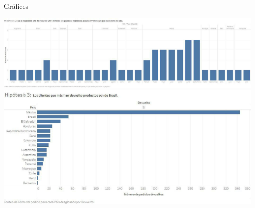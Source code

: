 \documentclass{beamer}
\begin{document}
\begin{frame}{Gráficos}

\begin{center}
\includegraphics[scale=0.25]{imagenes/Hipotesis2_2.jpg}
\includegraphics[scale=0.25]{imagenes/Hipotesis3.jpg}  
\end{center}
	
\end{frame}
	
\end{document}
